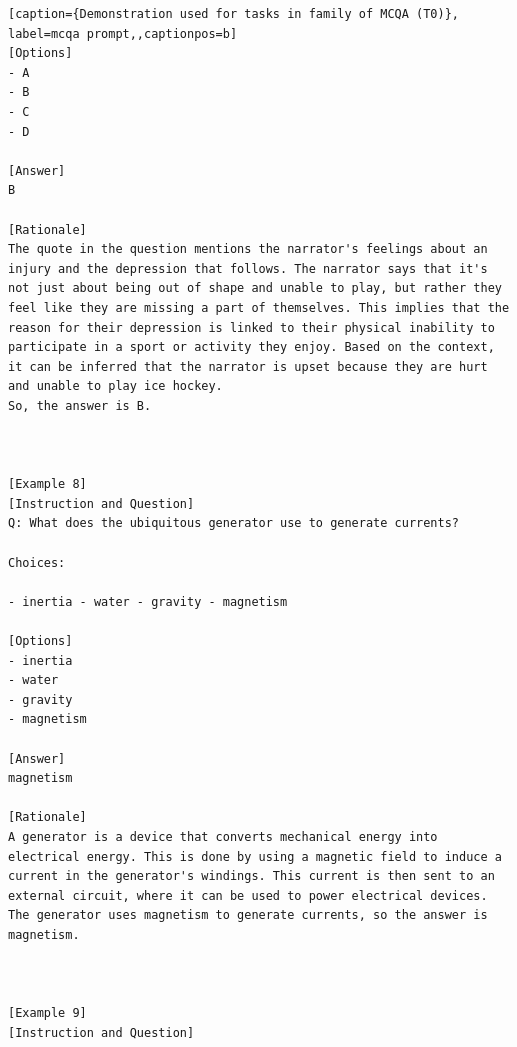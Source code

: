 \begin{lstlisting}[caption={Demonstration used for tasks in family of MCQA (T0)}, label=mcqa prompt,,captionpos=b]
[Options]
- A
- B
- C
- D

[Answer]
B

[Rationale]
The quote in the question mentions the narrator's feelings about an injury and the depression that follows. The narrator says that it's not just about being out of shape and unable to play, but rather they feel like they are missing a part of themselves. This implies that the reason for their depression is linked to their physical inability to participate in a sport or activity they enjoy. Based on the context, it can be inferred that the narrator is upset because they are hurt and unable to play ice hockey.
So, the answer is B.



[Example 8]
[Instruction and Question]
Q: What does the ubiquitous generator use to generate currents?

Choices:

- inertia - water - gravity - magnetism

[Options]
- inertia
- water
- gravity
- magnetism

[Answer]
magnetism

[Rationale]
A generator is a device that converts mechanical energy into electrical energy. This is done by using a magnetic field to induce a current in the generator's windings. This current is then sent to an external circuit, where it can be used to power electrical devices. The generator uses magnetism to generate currents, so the answer is magnetism.



[Example 9]
[Instruction and Question]

    \end{lstlisting}

